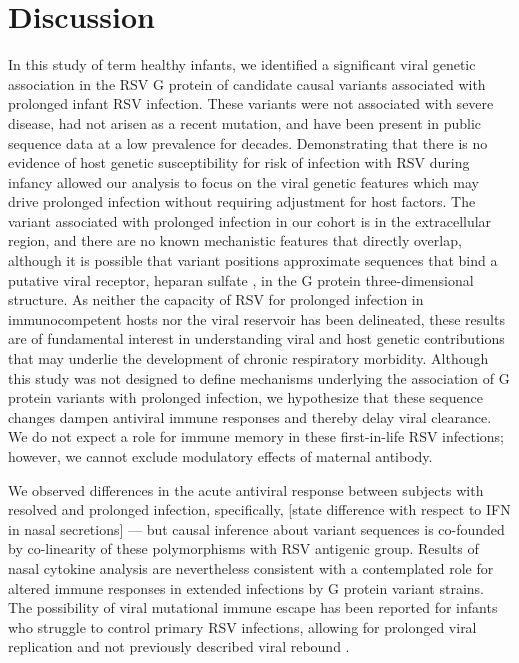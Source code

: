 \documentclass{article} %
\begin{document}
\section{Discussion}
In this study of term healthy infants, we identified a significant viral genetic association in the RSV G protein of candidate causal variants associated with prolonged infant RSV infection. These variants were not associated with severe disease, had not arisen as a recent mutation, and have been present in public sequence data at a low prevalence for decades. Demonstrating that there is no evidence of host genetic susceptibility for risk of infection with RSV during infancy allowed our analysis to focus on the viral genetic features which may drive prolonged infection without requiring adjustment for host factors. The variant associated with prolonged infection in our cohort is in the extracellular region, and there are no known mechanistic features that directly overlap, although it is possible that variant positions approximate sequences that bind a putative viral receptor, heparan sulfate \citep{feldman1999identification}, in the G protein three-dimensional structure.  As neither the capacity of RSV for prolonged infection in immunocompetent hosts nor the viral reservoir has been delineated,  these results are of fundamental interest in understanding viral and host genetic contributions that may underlie the development of chronic respiratory morbidity.
Although this study was not designed to define mechanisms underlying the association of G protein variants with prolonged infection, we hypothesize that these sequence changes dampen antiviral immune responses and thereby delay viral clearance. We do not expect a role for immune memory in these first-in-life RSV infections; however, we cannot exclude modulatory effects of maternal antibody. 

We observed differences in the acute antiviral response between subjects with resolved and prolonged infection, specifically, [state difference with respect to IFN in nasal secretions] — but causal inference about variant sequences is co-founded by co-linearity of these polymorphisms with RSV antigenic group. Results of nasal cytokine analysis are nevertheless consistent with a contemplated role for altered immune responses in extended infections by G protein variant strains. 
The possibility of viral mutational immune escape has been reported for 
infants who struggle to control primary RSV infections, allowing for prolonged viral replication and not previously described viral rebound
\citep{brint2017prolonged}.
\end{document}
